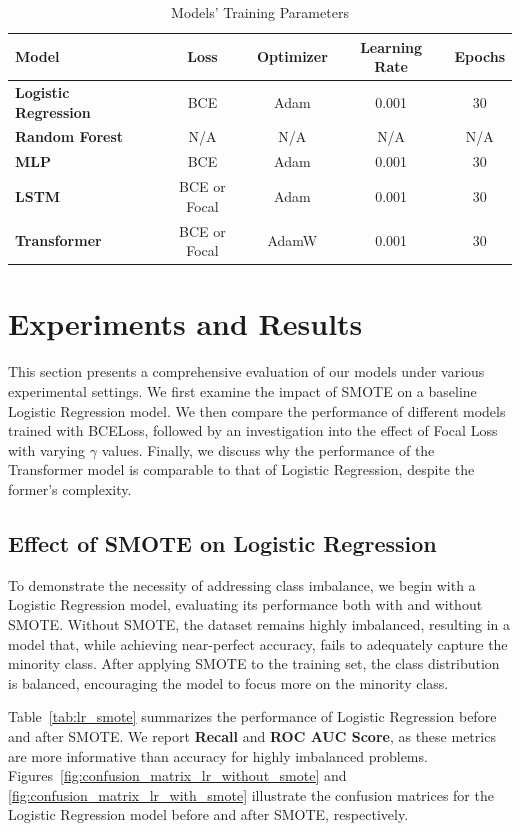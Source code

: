 \documentclass[11pt, oneside]{article}   	%
\begin{document}
\begin{table}[H]
\centering
\caption{Models' Training Parameters}
\label{table:model_params_train}
\begin{tabular}{lcccc}
\hline
\textbf{Model} & \textbf{Loss} & \textbf{Optimizer} & \textbf{Learning Rate} & \textbf{Epochs} \\ \hline
\textbf{Logistic Regression} & BCE & Adam & 0.001 & 30 \\[4pt]
\textbf{Random Forest} & N/A & N/A & N/A & N/A \\[4pt]
\textbf{MLP} & BCE & Adam & 0.001 & 30 \\[4pt]
\textbf{LSTM} & BCE or Focal & Adam & 0.001 & 30 \\[4pt]
\textbf{Transformer} & BCE or Focal & AdamW & 0.001 & 30 \\ \hline
\end{tabular}
\end{table}


\section{Experiments and Results}

This section presents a comprehensive evaluation of our models under various experimental settings. We first examine the impact of SMOTE on a baseline Logistic Regression model. We then compare the performance of different models trained with BCELoss, followed by an investigation into the effect of Focal Loss with varying \(\gamma\) values. Finally, we discuss why the performance of the Transformer model is comparable to that of Logistic Regression, despite the former's complexity.

\subsection{Effect of SMOTE on Logistic Regression}

To demonstrate the necessity of addressing class imbalance, we begin with a Logistic Regression model, evaluating its performance both with and without SMOTE. Without SMOTE, the dataset remains highly imbalanced, resulting in a model that, while achieving near-perfect accuracy, fails to adequately capture the minority class. After applying SMOTE to the training set, the class distribution is balanced, encouraging the model to focus more on the minority class.

Table~\ref{tab:lr_smote} summarizes the performance of Logistic Regression before and after SMOTE. We report \textbf{Recall} and \textbf{ROC AUC Score}, as these metrics are more informative than accuracy for highly imbalanced problems. Figures~\ref{fig:confusion_matrix_lr_without_smote} and \ref{fig:confusion_matrix_lr_with_smote} illustrate the confusion matrices for the Logistic Regression model before and after SMOTE, respectively.
\end{document}
